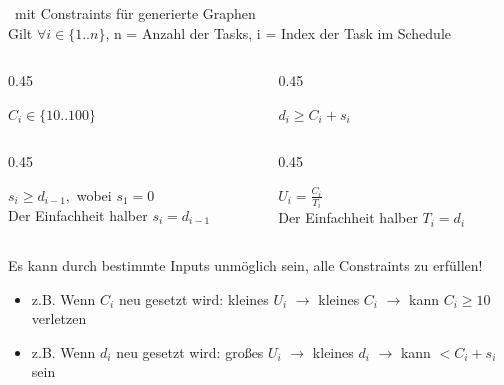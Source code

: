 \documentclass{include/sikslides}
\begin{document}
\begin{frame} {\subsecname ~mit \subsubsecname}
	Constraints für generierte Graphen  \\
	Gilt $\forall i \in \{1..n\}$, n = Anzahl der Tasks, i = Index der Task im Schedule
	\begin{columns}[T] %
		\begin{column}{0.45\textwidth}
			\begin{tcolorbox}
				$C_i  \in \{10..100\} $
			\end{tcolorbox}
		\end{column}
		\begin{column}{0.45\textwidth}
			\begin{tcolorbox}
				$d_i \ge C_i + s_i $
			\end{tcolorbox}
		\end{column}
	\end{columns}

	\begin{columns}[T]
		\begin{column}{0.45\textwidth}
			\begin{tcolorbox}
				$s_i \ge d_{i-1}, $ wobei $s_1 = 0$ \\
				Der Einfachheit halber $s_i = d_{i-1}$
			\end{tcolorbox}
		\end{column}
		\begin{column}{0.45\textwidth}
			\begin{tcolorbox}
				$U_i =  \frac{C_i}{T_i}$ \\
				Der Einfachheit halber $T_i = d_i$
			\end{tcolorbox}
		\end{column}
	\end{columns}
	\vspace{5mm}
	 {
		Es kann durch bestimmte Inputs unmöglich sein, alle Constraints zu erfüllen!
		\begin{itemize}
			\item z.B. Wenn $C_i$ neu gesetzt wird: kleines $U_i $ $\rightarrow$ kleines $C_i$ $\rightarrow$ kann $C_i \ge 10$ verletzen
			\item z.B. Wenn $d_i$ neu gesetzt wird: großes $U_i$ $\rightarrow$ kleines $d_i$ $\rightarrow$ kann $< C_i + s_i$ sein
		\end{itemize}
	}
\end{frame}
\end{document}
